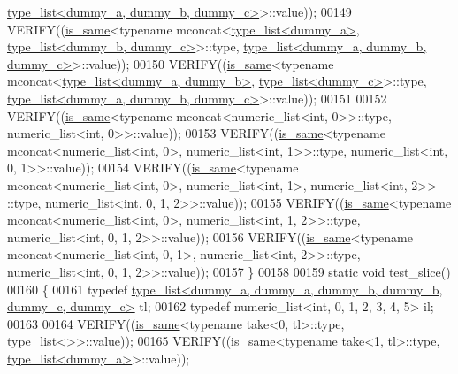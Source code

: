 \begin{DoxyCode}
      \hyperlink{struct_eigen_1_1internal_1_1type__list}{type\_list<dummy\_a, dummy\_b, dummy\_c>}>::value));
00149   VERIFY((\hyperlink{struct_eigen_1_1internal_1_1is__same}{is\_same}<\textcolor{keyword}{typename} mconcat<\hyperlink{struct_eigen_1_1internal_1_1type__list}{type\_list<dummy\_a>}, 
      \hyperlink{struct_eigen_1_1internal_1_1type__list}{type\_list<dummy\_b, dummy\_c>}>::type, 
      \hyperlink{struct_eigen_1_1internal_1_1type__list}{type\_list<dummy\_a, dummy\_b, dummy\_c>}>::value));
00150   VERIFY((\hyperlink{struct_eigen_1_1internal_1_1is__same}{is\_same}<\textcolor{keyword}{typename} mconcat<\hyperlink{struct_eigen_1_1internal_1_1type__list}{type\_list<dummy\_a, dummy\_b>}, 
      \hyperlink{struct_eigen_1_1internal_1_1type__list}{type\_list<dummy\_c>}>::type, 
      \hyperlink{struct_eigen_1_1internal_1_1type__list}{type\_list<dummy\_a, dummy\_b, dummy\_c>}>::value));
00151 
00152   VERIFY((\hyperlink{struct_eigen_1_1internal_1_1is__same}{is\_same}<\textcolor{keyword}{typename} mconcat<numeric\_list<int, 0>>::type, numeric\_list<int, 0>>::value));
00153   VERIFY((\hyperlink{struct_eigen_1_1internal_1_1is__same}{is\_same}<\textcolor{keyword}{typename} mconcat<numeric\_list<int, 0>, numeric\_list<int, 1>>::type, 
      numeric\_list<int, 0, 1>>::value));
00154   VERIFY((\hyperlink{struct_eigen_1_1internal_1_1is__same}{is\_same}<\textcolor{keyword}{typename} mconcat<numeric\_list<int, 0>, numeric\_list<int, 1>, numeric\_list<int, 2>>
      ::type, numeric\_list<int, 0, 1, 2>>::value));
00155   VERIFY((\hyperlink{struct_eigen_1_1internal_1_1is__same}{is\_same}<\textcolor{keyword}{typename} mconcat<numeric\_list<int, 0>, numeric\_list<int, 1, 2>>::type, 
      numeric\_list<int, 0, 1, 2>>::value));
00156   VERIFY((\hyperlink{struct_eigen_1_1internal_1_1is__same}{is\_same}<\textcolor{keyword}{typename} mconcat<numeric\_list<int, 0, 1>, numeric\_list<int, 2>>::type, 
      numeric\_list<int, 0, 1, 2>>::value));
00157 \}
00158 
00159 \textcolor{keyword}{static} \textcolor{keywordtype}{void} test\_slice()
00160 \{
00161   \textcolor{keyword}{typedef} \hyperlink{struct_eigen_1_1internal_1_1type__list}{type\_list<dummy\_a, dummy\_a, dummy\_b, dummy\_b, dummy\_c, dummy\_c>}
       tl;
00162   \textcolor{keyword}{typedef} numeric\_list<int, 0, 1, 2, 3, 4, 5> il;
00163 
00164   VERIFY((\hyperlink{struct_eigen_1_1internal_1_1is__same}{is\_same}<\textcolor{keyword}{typename} take<0, tl>::type, \hyperlink{struct_eigen_1_1internal_1_1type__list}{type\_list<>}>::value));
00165   VERIFY((\hyperlink{struct_eigen_1_1internal_1_1is__same}{is\_same}<\textcolor{keyword}{typename} take<1, tl>::type, \hyperlink{struct_eigen_1_1internal_1_1type__list}{type\_list<dummy\_a>}>::value));

\end{DoxyCode}
